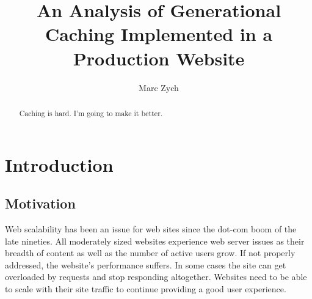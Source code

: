 \documentclass[12pt]{ucthesis}
\begin{document}

\title{An Analysis of Generational Caching Implemented in a Production Website}
\author{Marc Zych}
  
 
     



\maketitle

\begin{frontmatter}

\copyrightpage

\committeemembershippage

\begin{abstract}

Caching is hard. I'm going to make it better.

\end{abstract}


\tableofcontents


\listoftables

\listoffigures

\end{frontmatter}

\pagestyle{plain}




\renewcommand{\baselinestretch}{1.66}


\chapter{Introduction}
\label{introduction}

\section{Motivation}
Web scalability has been an issue for web sites since the dot-com boom of the late nineties. %
All moderately sized websites experience web server issues as their breadth of content as well as the number of active users grow.
If not properly addressed, the website's performance suffers.
In some cases the site can get overloaded by requests and stop responding altogether.
Websites need to be able to scale with their site traffic to continue providing a good user experience.
\end{document}
